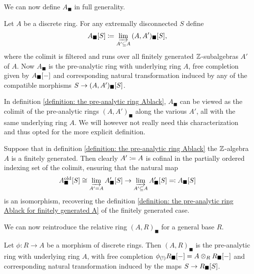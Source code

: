 We can now define $A_\blacksquare$ in full generality.
\begin{definition}
	\label{definition: the pre-analytic ring Ablack}
	
	Let $A$ be a discrete ring. For any extremally disconnected $S$ define
		$${A_\blacksquare[S]}\coloneqq \varinjlim_{A'\subseteq A} {(A, A')_\blacksquare[S]},$$
	where the colimit is filtered and runs over all finitely generated ${\mathbb{Z}}$-subalgebras $A'$ of $A$. Now $A_\blacksquare$ is the pre-analytic ring with underlying ring $A$, free completion given by ${A_\blacksquare[-]}$ and corresponding natural transformation induced by any of the compatible morphisms $S\to {(A, A')_\blacksquare[S]}$.
\end{definition}

\begin{remark}
	In definition \ref{definition: the pre-analytic ring Ablack}, $A_\blacksquare$ can be viewed as the colimit of the pre-analytic rings $(A, A')_\blacksquare$ along the various $A'$, all with the same underlying ring $A$. We will however not really need this characterization and thus opted for the more explicit definition.
\end{remark}

\begin{remark}
	Suppose that in definition \ref{definition: the pre-analytic ring Ablack} the ${\mathbb{Z}}$-algebra $A$ is a finitely generated. Then clearly $A'\coloneqq A$ is cofinal in the partially ordered indexing set of the colimit, ensuring that the natural map
		$${A_\blacksquare^{\text{old}}[S]} \cong \varinjlim_{A' = A} {A'_\blacksquare[S]} \to \varinjlim_{A'\subseteq A} {A'_\blacksquare[S]} \eqqcolon {A_\blacksquare[S]}$$
	is an isomorphism, recovering the definition \ref{definition: the pre-analytic ring Ablack for finitely generated A} of the finitely generated case.
\end{remark}

We can now reintroduce the relative ring $(A, R)_\blacksquare$ for a general base $R$.
\begin{definition}
	Let $\phi\colon R\to A$ be a morphism of discrete rings. Then $(A, R)_\blacksquare$ is the pre-analytic ring with underlying ring $A$, with free completion ${\phi_{(!)}}{R_\blacksquare[-]} = A\otimes_R {R_\blacksquare[-]}$ and corresponding natural transformation induced by the maps $S\to {R_\blacksquare[S]}$.
\end{definition}

